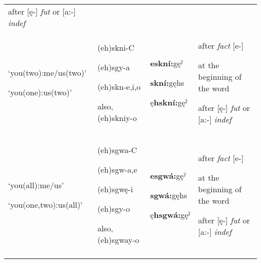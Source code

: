 \begin{table}
{\begin{tabularx}{\textwidth}{XXXX}
after [ę-] \textit{fut} or [a:-] \textit{indef}\\
‘you(two):me/us(two)’

‘you(one):us(two)’ & (eh)skni-C

(eh)sgy-a 

(eh)skn-e,i,o

also, (eh)skniy-o & \textbf{eskní:}gęˀ

\textbf{skní:}gęhs

ę\textbf{hskní:}gęˀ & after \textit{fact} [e-] 

at the beginning of the word 

after [ę-] \textit{fut} or [a:-] \textit{indef}\\
‘you(all):me/us’

‘you(one,two):us(all)’ & (eh)sgwa-C

(eh)sgw-a,e

(eh)sgwę-i

(eh)sgy-o

also, (eh)sgway-o & \textbf{esgwá:}gęˀ 

\textbf{sgwá:}gęhs

ę\textbf{hsgwá:}gęˀ & after \textit{fact} [e-] 

at the beginning of the word 

after [ę-] \textit{fut} or [a:-] \textit{indef}\\
\lspbottomrule
\end{tabularx}}
\end{table}


